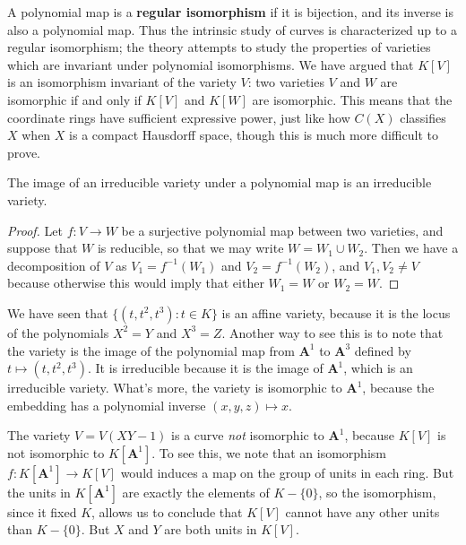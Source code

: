 A polynomial map is a {\bf regular isomorphism} if it is bijection, and its inverse is also a polynomial map. Thus the intrinsic study of curves is characterized up to a regular isomorphism; the theory attempts to study the properties of varieties which are invariant under polynomial isomorphisms. We have argued that $K[V]$ is an isomorphism invariant of the variety $V$: two varieties $V$ and $W$ are isomorphic if and only if $K[V]$ and $K[W]$ are isomorphic. This means that the coordinate rings have sufficient expressive power, just like how $C(X)$ classifies $X$ when $X$ is a compact Hausdorff space, though this is much more difficult to prove.

\begin{prop}
    The image of an irreducible variety under a polynomial map is an irreducible variety.
\end{prop}
\begin{proof}
    Let $f: V \to W$ be a surjective polynomial map between two varieties, and suppose that $W$ is reducible, so that we may write $W = W_1 \cup W_2$. Then we have a decomposition of $V$ as $V_1 = f^{-1}(W_1)$ and $V_2 = f^{-1}(W_2)$, and $V_1, V_2 \neq V$ because otherwise this would imply that either $W_1 = W$ or $W_2 = W$.
\end{proof}

\begin{example}
    We have seen that $\{ (t,t^2,t^3): t \in K \}$ is an affine variety, because it is the locus of the polynomials $X^2 = Y$ and $X^3 = Z$. Another way to see this is to note that the variety is the image of the polynomial map from $\mathbf{A}^1$ to $\mathbf{A}^3$ defined by $t \mapsto (t,t^2,t^3)$. It is irreducible because it is the image of $\mathbf{A}^1$, which is an irreducible variety. What's more, the variety is isomorphic to $\mathbf{A}^1$, because the embedding has a polynomial inverse $(x,y,z) \mapsto x$.
\end{example}

\begin{example}
    The variety $V = V(XY - 1)$ is a curve {\it not} isomorphic to $\mathbf{A}^1$, because $K[V]$ is not isomorphic to $K[\mathbf{A}^1]$. To see this, we note that an isomorphism $f: K[\mathbf{A}^1] \to K[V]$ would induces a map on the group of units in each ring. But the units in $K[\mathbf{A}^1]$ are exactly the elements of $K - \{ 0 \}$, so the isomorphism, since it fixed $K$, allows us to conclude that $K[V]$ cannot have any other units than $K - \{ 0 \}$. But $X$ and $Y$ are both units in $K[V]$.
\end{example}


